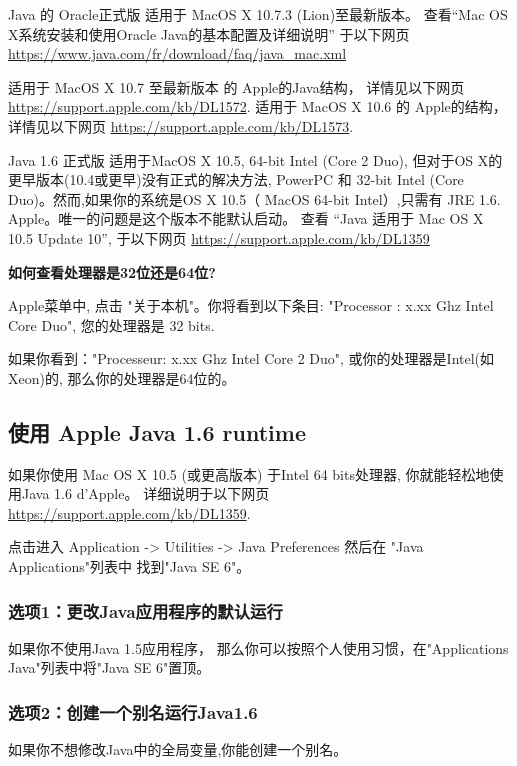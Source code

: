 \bigskip
\noindent Java 的 Oracle正式版 适用于 MacOS X 10.7.3 (Lion)至最新版本。
	查看``Mac OS X系统安装和使用Oracle Java的基本配置及详细说明'' 于以下网页 \url{https://www.java.com/fr/download/faq/java_mac.xml}

	

\bigskip
\noindent 适用于 MacOS X 10.7 至最新版本 的 Apple的Java结构，
	详情见以下网页 \url{https://support.apple.com/kb/DL1572}. 
	适用于 MacOS X 10.6 的 Apple的结构，
	详情见以下网页 \url{https://support.apple.com/kb/DL1573}.

\bigskip
\noindent Java 1.6 正式版 适用于MacOS X 10.5, 64-bit Intel (Core 2 Duo), 但对于OS X的更早版本(10.4或更早)没有正式的解决方法,
PowerPC 和 32-bit Intel (Core Duo)。然而,如果你的系统是OS X 10.5（ MacOS 64-bit Intel）,只需有 JRE 1.6. Apple。唯一的问题是这个版本不能默认启动。
	查看 ``Java 适用于 Mac OS X 10.5 Update 10'', 于以下网页 \url{https://support.apple.com/kb/DL1359}


\noindent\textbf{如何查看处理器是32位还是64位?}

\noindent Apple菜单中, 点击 "关于本机"。你将看到以下条目:
"Processor : x.xx Ghz Intel Core Duo", 您的处理器是 32 bits.

\bigskip
\noindent 如果你看到："Processeur: x.xx Ghz Intel Core 2 Duo", 或你的处理器是Intel(如Xeon)的, 那么你的处理器是64位的。

\subsection{使用 Apple Java 1.6 runtime}
\bigskip{}
\noindent 如果你使用 Mac OS X 10.5 (或更高版本) 于Intel 64 bits处理器, 你就能轻松地使用Java 1.6 d'Apple。
详细说明于以下网页 \url{https://support.apple.com/kb/DL1359}.

\noindent 点击进入 Application -> Utilities -> Java Preferences 
然后在 "Java Applications"列表中 找到"Java SE 6"。

\subsubsection{选项1：更改Java应用程序的默认运行}
\noindent 如果你不使用Java 1.5应用程序，
那么你可以按照个人使用习惯，在"Applications Java"列表中将"Java SE 6"置顶。

\subsubsection{选项2：创建一个别名运行Java1.6}
\noindent 如果你不想修改Java中的全局变量,你能创建一个别名。

